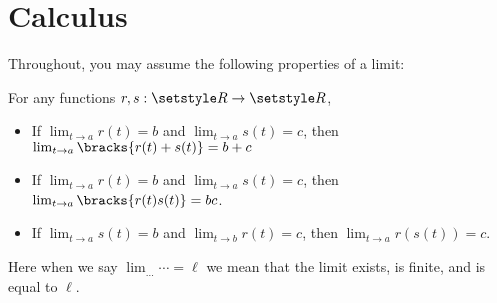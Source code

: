 \section*{Calculus}

Throughout, you may assume the following properties of a limit:

\begin{tcolorbox}
 For any functions \(r, s : \Reals \to \Reals\),
 \begin{itemize}
  \item
   If \(\lim_{t \to a} r(t) = b\) and \(\lim_{t \to a} s(t) = c\), then
   \(\lim_{t \to a} \bracks{r(t) + s(t)} = b + c\)
  \item
   If \(\lim_{t \to a} r(t) = b\) and \(\lim_{t \to a} s(t) = c\), then
   \(\lim_{t \to a} \bracks{r(t) s(t)} = bc\).
  \item
   If \(\lim_{t \to a} s(t) = b\) and \(\lim_{t \to b} r(t) = c\), then
   \(\lim_{t \to a} r(s(t)) = c\).
 \end{itemize}
 Here when we say \(\lim_{\ldots} \dotsb = \ell\) we mean that
 the limit exists, is finite, and is equal to \(\ell\).
\end{tcolorbox}

